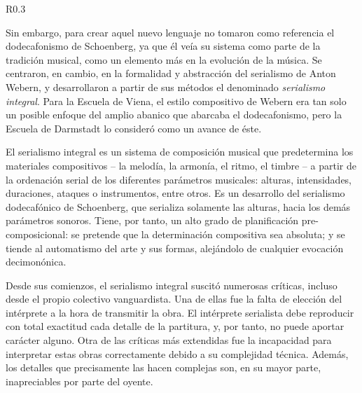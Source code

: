 		\begin{wrapfigure}{R}{0.3\textwidth}
		\captionsetup{justification=centering, font=footnotesize}
		\vspace{-0.5cm}
	\end{wrapfigure}
    Sin embargo, para crear aquel nuevo lenguaje no tomaron como referencia el dodecafonismo de Schoenberg, ya que él veía su sistema como parte de la tradición musical, como un elemento más en la evolución de la música. Se centraron, en cambio, en la formalidad y abstracción del serialismo de Anton Webern, y desarrollaron a partir de sus métodos el denominado \emph{serialismo integral}. Para la Escuela de Viena, el estilo compositivo de Webern era tan solo un posible enfoque del amplio abanico que abarcaba el dodecafonismo, pero la Escuela de Darmstadt lo consideró como un avance de éste.
	
	El serialismo integral es un sistema de composición musical que predetermina los materiales compositivos -- la melodía, la armonía, el ritmo, el timbre -- a partir de la ordenación serial de los diferentes parámetros musicales: alturas, intensidades, duraciones, ataques o instrumentos, entre otros. Es un desarrollo del serialismo dodecafónico de Schoenberg, que serializa solamente las alturas, hacia los demás parámetros sonoros. Tiene, por tanto, un alto grado de planificación pre-composicional: se pretende que la determinación compositiva sea absoluta; y se tiende al automatismo del arte y sus formas, alejándolo de cualquier evocación decimonónica.

	Desde sus comienzos, el serialismo integral suscitó numerosas críticas, incluso desde el propio colectivo vanguardista. Una de ellas fue la falta de elección del intérprete a la hora de transmitir la obra. El intérprete serialista debe reproducir con total exactitud cada detalle de la partitura, y, por tanto, no puede aportar carácter alguno. Otra de las críticas más extendidas fue la incapacidad para interpretar estas obras correctamente debido a su complejidad técnica. Además, los detalles que precisamente las hacen complejas son, en su mayor parte, inapreciables por parte del oyente.

